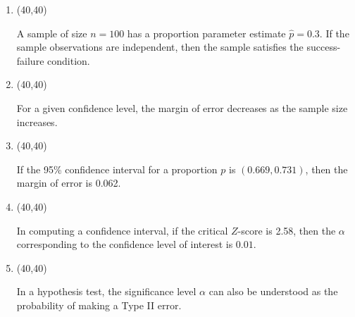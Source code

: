 \documentclass[11pt,twoside]{article}
\newcommand{\?}{\stackrel{?}{=}}
\newcommand{\gr}{\color{green!40!black}}
\begin{document}
\begin{enumerate}[\bf (i)]
\item \hfill
  \begin{minipage}{.1\linewidth}
    \framebox(40,40){ \gr }
  \end{minipage}\quad
  \begin{minipage}{.85\linewidth}
   A sample of size $n=100$ has a proportion parameter estimate $\hat{p} = 0.3$. If the sample observations are independent, then the sample satisfies the success-failure condition. 
   \end{minipage}
  
  \smallskip

  \item \hfill
  \begin{minipage}{.1\linewidth}
    \framebox(40,40){\gr  }
  \end{minipage}\quad
  \begin{minipage}{.85\linewidth}
    For a given confidence level, the margin of error decreases as the sample size increases.
  \end{minipage}

\smallskip

\item \hfill
  \begin{minipage}{.1\linewidth}
    \framebox(40,40){\gr  }
  \end{minipage}\quad
  \begin{minipage}{.85\linewidth}
    If the 95\% confidence interval for a proportion $p$ is $(0.669, 0.731)$, then the margin of error is 0.062. 
  \end{minipage}

  \smallskip

  \item \hfill
  \begin{minipage}{.1\linewidth}
    \framebox(40,40){\gr  }
  \end{minipage}\quad
  \begin{minipage}{.85\linewidth}
   In computing a confidence interval, if the critical $Z$-score is 2.58, then the $\alpha$ corresponding to the confidence level of interest is $0.01$.
   \end{minipage}

  \smallskip


\item \hfill
  \begin{minipage}{.1\linewidth}
    \framebox(40,40){\gr  }
  \end{minipage}\quad
  \begin{minipage}{.85\linewidth}
    In a hypothesis test, the significance level $\alpha$ can also be understood as the probability of making a Type II error.
  \end{minipage}


\end{enumerate}
\end{document}
